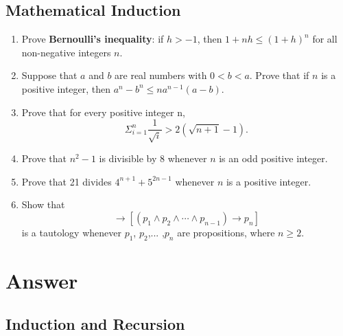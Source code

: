 \documentclass{../../cls/sig-alternate-05-2015}
\begin{document}
\subsection{Mathematical Induction}
\begin{enumerate}
\item Prove \textbf{Bernoulli’s inequality}: if $h > -1$, then $1+nh \le (1+h)^n$ for all non-negative integers $n$.

\item Suppose that $a$ and $b$ are real numbers with $0 < b < a$.
Prove that if $n$ is a positive integer, then $a^n - b^n \le na^{n - 1}(a - b)$.

\item Prove that for every positive integer n, \begin{equation}
	\Sigma_{i = 1}^n \frac{1}{\sqrt{i}} > 2(\sqrt{n + 1} - 1).
\end{equation}

\item Prove that $n^2 - 1$ is divisible by 8 whenever $n$ is an odd positive integer.

\item Prove that 21 divides $4^{n + 1} + 5^{2n - 1}$ whenever $n$ is a positive integer.

\item Show that \begin{equation}
	[(p_1 \rightarrow p_2) \wedge (p_2 \rightarrow p_3) \wedge \cdots \wedge (p_{n - 1} \rightarrow p_n)] \rightarrow [(p_1 \wedge p_2 \wedge \cdots \wedge p_{n - 1}) \rightarrow p_n]
\end{equation}
is a tautology whenever $p_1$, $p_2$,... ,$p_n$ are propositions, where $n \ge 2$.
\end{enumerate}

\nocite{*}

 
\clearpage
\appendix
\section{Answer}
\subsection{Induction and Recursion}
\end{document}
